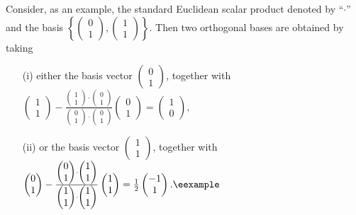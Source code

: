 {\color{blue}
\bexample
Consider, as an example, the standard Euclidean scalar product denoted by ``$\cdot$''
and the basis
$\left\{\begin{pmatrix}0\\1\end{pmatrix},\begin{pmatrix}1\\1\end{pmatrix}\right\}$.
Then two orthogonal bases are obtained by taking
\begin{itemize}
\item[(i)]
either the basis vector
$\begin{pmatrix}0\\1\end{pmatrix}$, together with
$
\begin{pmatrix}1\\1\end{pmatrix} -
\frac{\begin{pmatrix}1\\1\end{pmatrix}\cdot \begin{pmatrix}0\\1\end{pmatrix}}{\begin{pmatrix}0\\1\end{pmatrix}\cdot \begin{pmatrix}0\\1\end{pmatrix}} \begin{pmatrix}0\\1\end{pmatrix} = \begin{pmatrix}1\\0\end{pmatrix},
$
\item[(ii)]
or the basis vector
$\begin{pmatrix}1\\1\end{pmatrix}$, together with
$
\begin{pmatrix}0\\1\end{pmatrix} -
\frac{\begin{pmatrix}0\\1\end{pmatrix}\cdot \begin{pmatrix}1\\1\end{pmatrix}}{\begin{pmatrix}1\\1\end{pmatrix}\cdot \begin{pmatrix}1\\1\end{pmatrix}} \begin{pmatrix}1\\1\end{pmatrix} = \frac{1}{2}\begin{pmatrix}-1\\1\end{pmatrix}. \textrm{\eexample}
$
\end{itemize}
}

